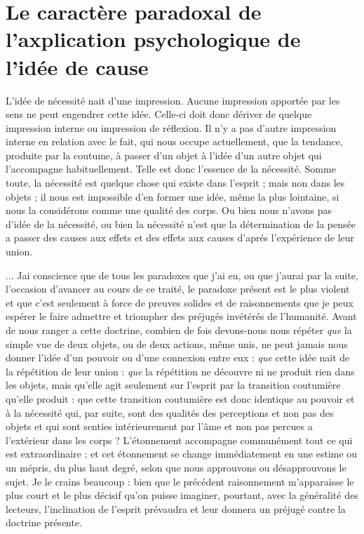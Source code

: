 
\section{Le caractère paradoxal de l'axplication psychologique
de l'idée de cause}

L’idée de nécessité nait d’une impression. Aucune
impression apportée par les sens ne peut engendrer cette
idée. Celle-ci doit donc dériver de quelque impression
interne ou impression de réflexion. Il n’y a pas d’autre
impression interne en relation avec le fait, qui nous occupe
actuellement, que la tendance, produite par la coutume,
à passer d’un objet à l’idée d’un autre objet qui l’accompagne
habituellement. Telle est donc l’essence de la nécessité.
Somme toute, la nécessité est quelque chose qui existe
dans l’esprit ; mais non dans les objets ; il nous est impossible
d’en former une idée, même la plus lointaine, si nous
la considérons comme une qualité des corps. Ou bien nous
n’avons pas d’idée de la nécessité, ou bien la nécessité
n'est que la détermination de la pensée a passer des causes
aux effets et des effets aux causes d'aprés l’expérience de
leur union.

... Jai conscience que de tous les paradoxes que j’ai
eu, ou que j’aurai par la suite, l’occasion d’avancer au
cours de ce traité, le paradoxe présent est le plus violent
et que c’est seulement à force de preuves solides et de
raisonnements que je peux espérer le faire admettre et
triompher des préjugés invétérés de l’humanité. Avant
de nous ranger a cette doctrine, combien de fois devons-nous
nous répéter {\it que} la simple vue de deux objets, ou
de deux actions, même unis, ne peut jamais nous donner
l'idée d’un pouvoir ou d’une connexion entre eux : {\it que}
cette idée nait de la répétition de leur union : {\it que} la répétition
ne découvre ni ne produit rien dans les objets, mais
qu’elle agit seulement sur l’esprit par la transition coutumière
qu’elle produit : que cette transition coutumière
est donc identique au pouvoir et à la nécessité qui, par
suite, sont des qualités des perceptions et non pas des
objets et qui sont senties intérieurement par l’âme et
non pas percues a l’extérieur dans les corps ? L’étonnement
accompagne communément tout ce qui est extraordinaire ;
et cet étonnement se change immédiatement en une
estime ou un mépris, du plus haut degré, selon que nous
approuvons ou désapprouvons le sujet. Je le crains
beaucoup : bien que le précédent raisonnement m’apparaisse
le plus court et le plus décisif qu’on puisse imaginer,
pourtant, avec la généralité des lecteurs, l’inclination de
l'esprit prévaudra et leur donnera un préjugé contre la
doctrine présente.

